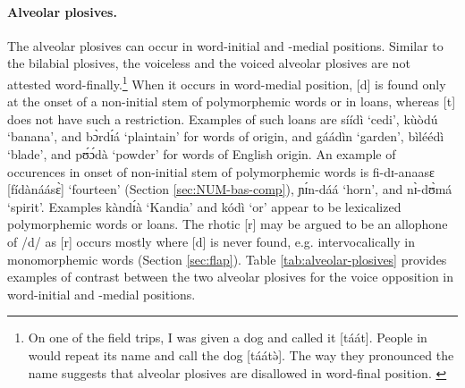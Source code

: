 \newpage 
\paragraph{Alveolar plosives.}
\label{sec:PHO-alveo-plos}  

The alveolar plosives can occur in word-initial and  -medial positions. Similar
to the bilabial plosives, the voiceless and the voiced alveolar plosives  are
not attested word-finally.\footnote{On one of the field trips, I was given a dog
and  called it [{\sls táát}]. People in  would repeat its name and call 
the 
dog
[{\sls táátə̀}]. The way they pronounced the name suggests that alveolar 
plosives are disallowed in word-final position. \label{fn:taat-epenthesis}}  
When it occurs in word-medial position,  [{d}] is found only at the onset of a non-initial stem of polymorphemic words or in loans, whereas [{t}] does 
not 
have such a restriction. Examples of such loans are  {\sls síídì} `cedi', 
{\sls kùòdú} `banana', and {\sls bɔ̀rdɪ́á} `plaintain'  for words of  
origin, and  {\sls gáádìn} `garden', {\sls bìléédì} `blade',  and 
{\sls pʊ́ɔ́dà} `powder' for words of English origin. An example of occurences 
in onset of non-initial stem of polymorphemic words is {\sls fi-dɪ-anaasɛ} 
[{\sls fídànáásɛ̀}] `fourteen' (Section \ref{sec:NUM-bas-comp}),   
{\sls ɲɪ́n-dáá}	`horn', and {\sls nɪ̀-dʊ̀má}  `spirit'.  Examples 
{\sls kàndɪ́à} `Kandia'  and {\sls kódì} `or' appear to be lexicalized 
polymorphemic words or loans. The rhotic [{r}] may be argued to be an 
allophone of /{d}/ as   [{r}] occurs mostly where [{d}] is 
never 
found, e.g. intervocalically in monomorphemic words (Section \ref{sec:flap}). 
Table \ref{tab:alveolar-plosives} provides examples of contrast between the two 
alveolar plosives for the {\sc voice} opposition in word-initial and  -medial 
positions.


